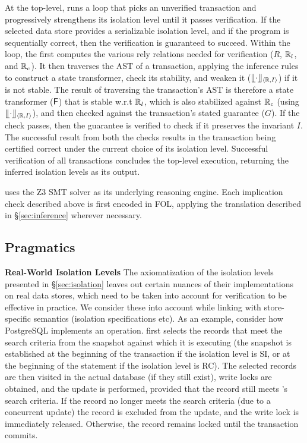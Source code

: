 At the top-level, \thetool runs a loop that picks an unverified
transaction and progressively strengthens its isolation level until it
passes verification. If the selected data store provides a
serializable isolation level, and if the program is sequentially
correct, then the verification is guaranteed to succeed. Within the
loop, the \thetool first computes the various rely relations needed for
verification ($R$, $\mathbb{R}_l$, and $\mathbb{R}_c$). It then traverses the AST of a
transaction, applying the inference rules to construct a state
transformer, check its stability, and weaken it ($\llfloor \cdot \rrfloor_{\langle \mathbb{R},I \rangle}$)
if it is not stable. The result of traversing the transaction's AST is
therefore a state transformer (${\sf F}$) that is stable w.r.t $\mathbb{R}_l$, which
is also stabilized against $\mathbb{R}_c$ (using $\llfloor \cdot \rrfloor_{\langle \mathbb{R},I \rangle}$), and
then checked against the transaction's stated guarantee ($G$). If the
check passes, then the guarantee is verified to check if it preserves
the invariant $I$. The successful result from both the checks results
in the transaction being certified correct under the current choice of
its isolation level. Successful verification of all transactions
concludes the top-level execution, returning the inferred isolation
levels as its output.

\thetool uses the Z3 SMT solver as its underlying reasoning engine. Each
implication check described above is first encoded in FOL, applying
the translation described in \S\ref{sec:inference} wherever
necessary.

\subsection{Pragmatics}

\textbf{Real-World Isolation Levels} The axiomatization of the
isolation levels presented in \S\ref{sec:isolation} leaves out
certain nuances of their implementations on real data stores, which
need to be taken into account for verification to be effective in
practice.  We consider these into account while linking \thetool with
store-specific semantics (isolation specifications etc). As an
example, consider how PostgreSQL implements an  operation.
 first selects the records that meet the search criteria
from the snapshot against which it is executing (the snapshot is
established at the beginning of the transaction if the isolation level
is SI, or at the beginning of the  statement if the
isolation level is RC). The selected records are then visited in the
actual database (if they still exist), write locks are obtained, and
the update is performed, provided that the record still meets
's search criteria. If the record no longer meets the
search criteria (due to a concurrent update) the record is excluded
from the update, and the write lock is immediately released.
Otherwise, the record remains locked until the transaction commits. 

